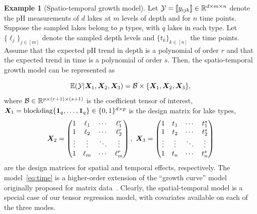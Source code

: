 \documentclass{article}
\theoremstyle{plain}
\theoremstyle{definition}
\newtheorem{example}{Example}
\begin{document}
\begin{example}[Spatio-temporal growth model]
{Let $\mathcal{Y}=\llbracket y_{ijk} \rrbracket\in\mathbb{R}^{d \times m\times n}$ denote the pH measurements of $d$ lakes at $m$ levels of depth and for $n$ time points. Suppose the sampled lakes belong to $p$ types, with $q$ lakes in each type. Let $\{\ell_j\}_{j\in[m]}$ denote the sampled depth levels and $\{t_k\}_{k\in[n]}$ the time points. Assume that the expected pH trend in depth is a polynomial of order $r$ and that the expected trend in time is a polynomial of order $s$. Then, the spatio-temporal growth model can be represented as}

\begin{equation}\label{eq:time}
\mathbb{E}(\mathcal{Y}|\bm X_1,\bm X_2,\bm X_3)=\mathcal{B}\times\{\bm X_1,\bm X_2,\bm X_3\},
\end{equation}
where $\mathcal{B}\in\mathbb{R}^{p\times (r+1)\times (s+1)}$ is the coefficient tensor of interest, $\bm X_1=\text{blockdiag}\{\mathbf{1}_q,\ldots,\mathbf{1}_q\}\in \{0,1\}^{d\times p}$ is the design matrix for lake types, 
\[
\bm X_2=
\begin{pmatrix}
1 & \ell_1&\cdots &\ell^{r}_1\\
1 & \ell_2&\cdots &\ell^{r}_2\\
\vdots &\vdots&\ddots&\vdots\\
1&\ell_{m}&\cdots&\ell^{r}_{m}
\end{pmatrix},\
\bm X_3=
\begin{pmatrix}
1 & t_1&\cdots &t^{s}_1\\
1 & t_2&\cdots &t^{s}_2\\
\vdots &\vdots&\ddots&\vdots\\
1&t_{n}&\cdots&t^{s}_{n}
\end{pmatrix}
\]
{are the design matrices for spatial and temporal effects, respectively. The model~\eqref{eq:time} is a higher-order extension of the ``growth curve'' model originally proposed for matrix} data~\cite{gabriel1998generalised,potthoff1964generalized,srivastava2008models}. {Clearly, the spatial-temporal model is a special case of our tensor regression model, with covariates available on each of the three modes. } 
\end{example}
\end{document}

